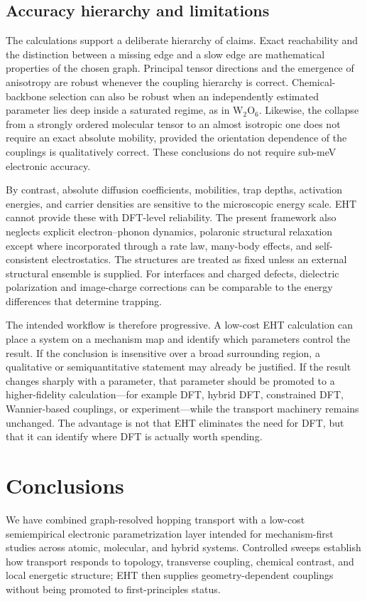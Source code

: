 \documentclass[aps,prmaterials,reprint,amsmath,amssymb,superscriptaddress,longbibliography]{revtex4-2}
\begin{document}
\subsection{Accuracy hierarchy and limitations}
The calculations support a deliberate hierarchy of claims. Exact reachability and the distinction between a missing edge and a slow edge are mathematical properties of the chosen graph. Principal tensor directions and the emergence of anisotropy are robust whenever the coupling hierarchy is correct. Chemical-backbone selection can also be robust when an independently estimated parameter lies deep inside a saturated regime, as in W$_2$O$_6$. Likewise, the collapse from a strongly ordered molecular tensor to an almost isotropic one does not require an exact absolute mobility, provided the orientation dependence of the couplings is qualitatively correct. These conclusions do not require sub-meV electronic accuracy.

By contrast, absolute diffusion coefficients, mobilities, trap depths, activation energies, and carrier densities are sensitive to the microscopic energy scale. EHT cannot provide these with DFT-level reliability. The present framework also neglects explicit electron--phonon dynamics, polaronic structural relaxation except where incorporated through a rate law, many-body effects, and self-consistent electrostatics. The structures are treated as fixed unless an external structural ensemble is supplied. For interfaces and charged defects, dielectric polarization and image-charge corrections can be comparable to the energy differences that determine trapping.

The intended workflow is therefore progressive. A low-cost EHT calculation can place a system on a mechanism map and identify which parameters control the result. If the conclusion is insensitive over a broad surrounding region, a qualitative or semiquantitative statement may already be justified. If the result changes sharply with a parameter, that parameter should be promoted to a higher-fidelity calculation---for example DFT, hybrid DFT, constrained DFT, Wannier-based couplings, or experiment---while the transport machinery remains unchanged. The advantage is not that EHT eliminates the need for DFT, but that it can identify where DFT is actually worth spending.

\section{Conclusions}
We have combined graph-resolved hopping transport with a low-cost semiempirical electronic parametrization layer intended for mechanism-first studies across atomic, molecular, and hybrid systems. Controlled sweeps establish how transport responds to topology, transverse coupling, chemical contrast, and local energetic structure; EHT then supplies geometry-dependent couplings without being promoted to first-principles status.
\end{document}
